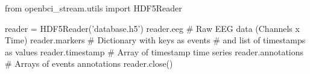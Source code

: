 \begin{python}
from openbci_stream.utils import HDF5Reader

reader = HDF5Reader('database.h5')
reader.eeg          # Raw EEG data (Channels x Time)
reader.markers      # Dictionary with keys as events 
                    # and list of timestamps as values
reader.timestamp    # Array of timestamp time series
reader.annotations  # Arrays of events annotations  
reader.close()
\end{python}